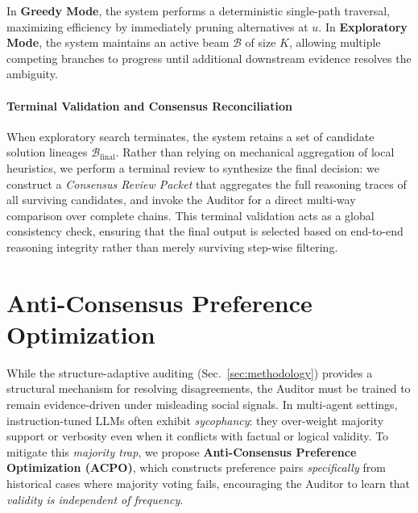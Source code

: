 \documentclass{article}
\theoremstyle{plain}
\theoremstyle{definition}
\theoremstyle{remark}
\begin{document}
In \textbf{Greedy Mode}, the system performs a deterministic single-path traversal, maximizing efficiency by immediately pruning alternatives at $u$.
In \textbf{Exploratory Mode}, the system maintains an active beam $\mathcal{B}$ of size $K$, allowing multiple competing branches to progress until additional downstream evidence resolves the ambiguity.

\paragraph{Terminal Validation and Consensus Reconciliation}
When exploratory search terminates, the system retains a set of candidate solution lineages $\mathcal{B}_{\text{final}}$.
Rather than relying on mechanical aggregation of local heuristics, we perform a terminal review to synthesize the final decision: we construct a \textit{Consensus Review Packet} that aggregates the full reasoning traces of all surviving candidates, and invoke the Auditor for a direct multi-way comparison over complete chains. This terminal validation acts as a global consistency check, ensuring that the final output is selected based on end-to-end reasoning integrity rather than merely surviving step-wise filtering.





\section{Anti-Consensus Preference Optimization}
\label{app:training}

While the structure-adaptive auditing (Sec.~\ref{sec:methodology}) provides a structural mechanism for resolving disagreements, the Auditor must be trained to remain evidence-driven under misleading social signals. In multi-agent settings, instruction-tuned LLMs often exhibit \emph{sycophancy}: they over-weight majority support or verbosity even when it conflicts with factual or logical validity. To mitigate this \emph{majority trap}, we propose \textbf{Anti-Consensus Preference Optimization (ACPO)}, which constructs preference pairs \emph{specifically} from historical cases where majority voting fails, encouraging the Auditor to learn that \emph{validity is independent of frequency}.
\end{document}
